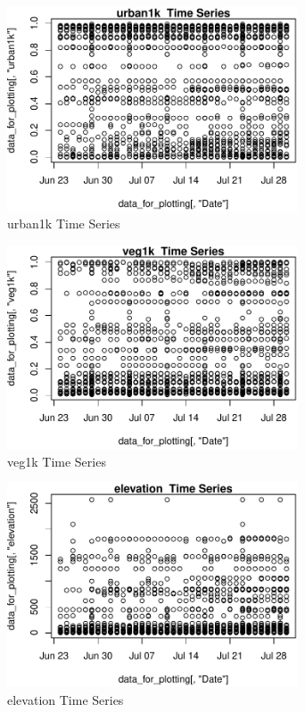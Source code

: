 \begin{figure} 
\centering  
\includegraphics[width=0.77\textwidth]{Code_Outputs/ML_input_report_AllforCaret_cleaned_StepPractice_part_practice_urban1kTS.pdf} 
\caption{\label{fig:ML_input_report_AllforCaret_cleaned_StepPractice_part_practiceurban1kTS}urban1k  Time Series} 
\end{figure} 
 

\begin{figure} 
\centering  
\includegraphics[width=0.77\textwidth]{Code_Outputs/ML_input_report_AllforCaret_cleaned_StepPractice_part_practice_veg1kTS.pdf} 
\caption{\label{fig:ML_input_report_AllforCaret_cleaned_StepPractice_part_practiceveg1kTS}veg1k  Time Series} 
\end{figure} 
 

\begin{figure} 
\centering  
\includegraphics[width=0.77\textwidth]{Code_Outputs/ML_input_report_AllforCaret_cleaned_StepPractice_part_practice_elevationTS.pdf} 
\caption{\label{fig:ML_input_report_AllforCaret_cleaned_StepPractice_part_practiceelevationTS}elevation  Time Series} 
\end{figure} 
 

